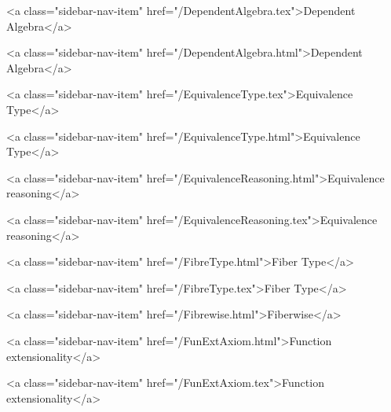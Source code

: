       
    
      
        
          <a class="sidebar-nav-item" href="/DependentAlgebra.tex">Dependent Algebra</a>
        
      
    
      
        
          <a class="sidebar-nav-item" href="/DependentAlgebra.html">Dependent Algebra</a>
        
      
    
      
        
          <a class="sidebar-nav-item" href="/EquivalenceType.tex">Equivalence Type</a>
        
      
    
      
        
          <a class="sidebar-nav-item" href="/EquivalenceType.html">Equivalence Type</a>
        
      
    
      
        
          <a class="sidebar-nav-item" href="/EquivalenceReasoning.html">Equivalence reasoning</a>
        
      
    
      
        
          <a class="sidebar-nav-item" href="/EquivalenceReasoning.tex">Equivalence reasoning</a>
        
      
    
      
        
          <a class="sidebar-nav-item" href="/FibreType.html">Fiber Type</a>
        
      
    
      
        
          <a class="sidebar-nav-item" href="/FibreType.tex">Fiber Type</a>
        
      
    
      
        
          <a class="sidebar-nav-item" href="/Fibrewise.html">Fiberwise</a>
        
      
    
      
        
          <a class="sidebar-nav-item" href="/FunExtAxiom.html">Function extensionality</a>
        
      
    
      
        
          <a class="sidebar-nav-item" href="/FunExtAxiom.tex">Function extensionality</a>
        
